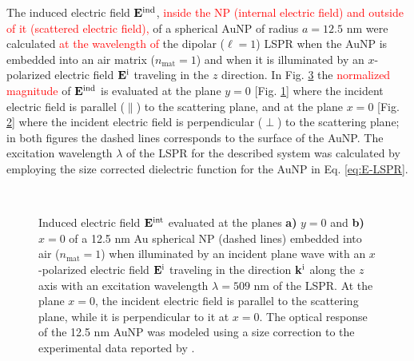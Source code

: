 The induced electric field $\vb{E}^\text{ind}$, \textcolor{red}{inside the NP (internal electric field) and outside of it (scattered electric field),} of a spherical AuNP of radius $a = 12.5$ nm were calculated \textcolor{red}{at the wavelength of} the dipolar ($\ell = 1$) LSPR when the AuNP is embedded into an air matrix ($n_\text{mat} = 1$) and when it is illuminated by an $x$-polarized electric field $\vb{E}^\text{i}$ traveling in the $z$ direction. In Fig. \ref{fig:NearField} the \textcolor{red}{normalized magnitude} of $\vb{E}^\text{ind}$ is evaluated at the plane $y = 0$ [Fig. \ref{fig:NearField:par}] where the incident electric field is parallel ($\parallel$) to the scattering plane, and at the plane $x = 0$ [Fig. \ref{fig:NearField:perp}]  where the incident electric field is perpendicular ($\perp$) to the scattering plane; in both figures the dashed lines corresponds to the surface of the AuNP. The excitation wavelength $\lambda$ of the LSPR for the described system was calculated by employing the size corrected dielectric function for the AuNP in Eq. \eqref{eq:E-LSPR}.

\begin{figure}[t!]
	\def\svgwidth{\textwidth} \small\centering
		\vspace*{4.em}
		\hspace*{-.45\textwidth}
	\begin{subfigure}{.49\textwidth}%
		\caption{ } \label{fig:NearField:par}%
		\end{subfigure}%
	\begin{subfigure}{.49\textwidth}%
		\caption{ }\label{fig:NearField:perp}%
		\end{subfigure}%
	\vspace*{-7.em}\\
	\vspace*{-2em}
	\caption[Induced Electric Field of a 12.5 nm Au Spherical NP Embedded into Air at the LSPR]{Induced electric field $\vb{E}^\text{int}$ evaluated at the planes \textbf{a)} $y = 0$ and \textbf{b)} $x = 0$  of a 12.5 nm Au spherical NP (dashed lines) embedded into air ($n_\text{mat} = 1$) when illuminated by an incident plane wave with an $x$-polarized electric field $\vb{E}^\text{i}$ traveling in the direction $\vb{k}^\text{i}$ along the $z$ axis with an	 excitation wavelength $\lambda = 509$ nm of the LSPR. At the plane $x = 0$, the incident electric field is parallel to the scattering plane, while it is perpendicular to it at $x = 0$. The optical response of the 12.5 nm AuNP was modeled using a size correction to the experimental data reported by \citeauthor{johnson_optical_1972} \cite{johnson_optical_1972}.}
	\label{fig:NearField}
 \end{figure}

